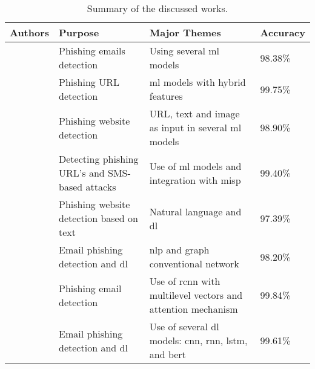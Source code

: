 \begin{table}[ht]
    \centering
    \begin{tabular}{p{4cm}p{4cm}p{4cm}p{2cm}}
    \hline
    \textbf{Authors} & \textbf{Purpose} & \textbf{Major Themes} & \textbf{Accuracy} \\
    \hline
    \citet{rabbi2023phishy} & Phishing emails detection & Using several \ac{ml} models & 98.38\% \\
    \hline
    \citet{Kumar2023222} & Phishing URL detection & \ac{ml} models with hybrid features & 99.75\% \\
    \hline
    \citet{Shaukat2023} & Phishing website detection & URL, text and image as input in several \ac{ml} models & 98.90\% \\
    \hline
    \citet{Karhani2023206} & Detecting phishing URL's and SMS-based attacks & Use of \ac{ml} models and integration with \ac{misp} & 99.40\% \\
    \hline
    \citet{Benavides-Astudillo2023} & Phishing website detection based on text & Natural language and \ac{dl} & 97.39\% \\
    \hline
    \citet{ALHOGAIL2021102414} & Email phishing detection and \ac{dl} & \ac{nlp} and graph conventional network & 98.20\% \\
    \hline
    \citet{8701426} & Phishing email detection & Use of \ac{rcnn} with multilevel vectors and attention mechanism & 99.84\% \\
    \hline
    \citet{atawneh2023phishing} & Email phishing detection and \ac{dl} & Use of several \ac{dl} models: \ac{cnn}, \ac{rnn}, \ac{lstm}, and \ac{bert} & 99.61\% \\
    \hline
    \end{tabular}
    \caption{Summary of the discussed works.}
    \label{tbl:c2:comparison_table}
    \end{table}